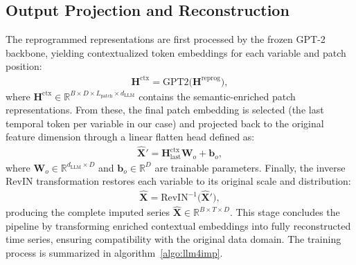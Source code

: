 \documentclass[conference]{IEEEtran}
\begin{document}
\subsection{Output Projection and Reconstruction}
The reprogrammed representations are first processed by the frozen GPT-2 backbone, yielding contextualized token embeddings for each variable and patch position:
\begin{align}
\mathbf{H}^{\text{ctx}} = \mathrm{GPT2}\big(\mathbf{H}^{\text{reprog}}\big),
\label{eq:gpt2_forward}
\end{align}
where $\mathbf{H}^{\text{ctx}} \in \mathbb{R}^{B \times D \times L_{\text{patch}} \times d_{\mathrm{LLM}}}$ contains the semantic-enriched patch representations.
From these, the final patch embedding is selected (the last temporal token per variable in our case) and projected back to the original feature dimension through a linear flatten head defined as:
\begin{align}
\hat{\mathbf{X}}' = \mathbf{H}^{\text{ctx}}_{\text{last}} \mathbf{W}_o + \mathbf{b}_o,
\label{eq:flatten_projection}
\end{align}
where $\mathbf{W}_o \in \mathbb{R}^{d_{\mathrm{LLM}} \times D}$ and $\mathbf{b}_o \in \mathbb{R}^D$ are trainable parameters.
Finally, the inverse RevIN transformation restores each variable to its original scale and distribution:
\begin{align}
\hat{\mathbf{X}} = \mathrm{RevIN}^{-1}\big(\hat{\mathbf{X}}'\big),
\label{eq:revin_inverse}
\end{align}
producing the complete imputed series $\hat{\mathbf{X}} \in \mathbb{R}^{B \times T \times D}$.
This stage concludes the pipeline by transforming enriched contextual embeddings into fully reconstructed time series, ensuring compatibility with the original data domain. The training process is summarized in algorithm~\ref{algo:llm4imp}.
\end{document}
